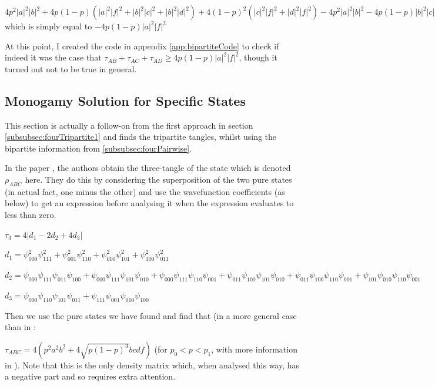 \documentclass[12pt,a4paper]{article}
\numberwithin{equation}{section}
\begin{document}
\noindent $4p^2|a|^2|b|^2 + 4p(1-p)(|a|^2|f|^2+|b|^2|c|^2+|b|^2|d|^2) + 4(1-p)^2(|c|^2|f|^2+|d|^2|f|^2) - 4p^2|a|^2|b|^2 - 4p(1-p)|b|^2|c|^2 - 4p(1-p)|a|^2|f|^2 - 4(1-p)^2|d|^2|f|^2 - 4p(1-p)|b|^2|d|^2 - 4p(1-p)|a|^2|f|^2 - 4(1-p)^2|c|^2|f|^2$ which is simply equal to $-4p(1-p)|a|^2|f|^2$

At this point, I created the code in appendix \ref{app:bipartiteCode} to check if indeed it was the case that $\tau_{AB} + \tau_{AC} + \tau_{AD} \geq 4p(1-p)|a|^2|f|^2$, though it turned out not to be true in general.


\subsection{Monogamy Solution for Specific States}
\label{subsec:actualFourSolution}

This section is actually a follow-on from the first approach in section \ref{subsubsec:fourTripartite1} and finds the tripartite tangles, whilst using the bipartite information from \ref{subsubsec:fourPairwise}.

In the paper \cite{LOSU}, the authors obtain the three-tangle of the state which is denoted $\rho_{ABC}$ here. They do this by considering the superposition of the two pure states (in actual fact, one minus the other) and use the wavefunction coefficients (as below) to get an expression before analysing it when the expression evaluates to less than zero.

$\tau_3 = 4|d_1 - 2d_2 + 4d_3|$

$d_1 = \psi_{000}^2\psi_{111}^2 + \psi_{001}^2\psi_{110}^2 + \psi_{010}^2\psi_{101}^2 + \psi_{100}^2\psi_{011}^2$

$d_2 = \psi_{000}\psi_{111}\psi_{011}\psi_{100} + \psi_{000}\psi_{111}\psi_{101}\psi_{010} + \psi_{000}\psi_{111}\psi_{110}\psi_{001} + \psi_{011}\psi_{100}\psi_{101}\psi_{010} + \psi_{011}\psi_{100}\psi_{110}\psi_{001} + \psi_{101}\psi_{010}\psi_{110}\psi_{001}$

$d_3 = \psi_{000}\psi_{110}\psi_{101}\psi_{011} + \psi_{111}\psi_{001}\psi_{010}\psi_{100}$

Then we use the pure states we have found and find that (in a more general case than in \cite{LOSU}:

$\tau_{ABC} = 4(p^2a^2b^2 + 4\sqrt{p(1-p)^3}bcdf)$ (for $p_0 < p < p_1$, with more information in \cite{EOSU}). Note that this is the only density matrix which, when analysed this way, has a negative part and so requires extra attention.
\end{document}

